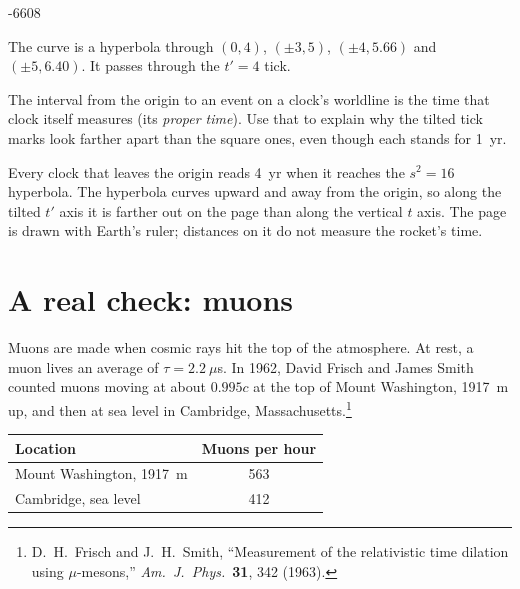 \documentclass{handout}
\newcommand{\room}[1]{0.35in plus #1fill}
\begin{document}
\begin{questions}
  \begin{center}
  \begin{spacetime}[0.8]{-6}{6}{0}{8}
  \end{spacetime}
  \end{center}

  \begin{solution}[\room{1}]
    The curve is a hyperbola through $(0,4)$, $(\pm3, 5)$, $(\pm4, 5.66)$ and
    $(\pm5, 6.40)$. It passes through the $t' = 4$ tick.
  \end{solution}

  \question The interval from the origin to an event on a clock's worldline is
  the time that clock itself measures (its \emph{proper time}). Use that to
  explain why the tilted tick marks look farther apart than the square ones,
  even though each stands for 1~yr.
  \begin{solution}[\room{2}]
    Every clock that leaves the origin reads 4~yr when it reaches the
    $s^2=16$ hyperbola. The hyperbola curves upward and away from the origin, so
    along the tilted $t'$ axis it is farther out on the page than along the
    vertical $t$ axis. The page is drawn with Earth's ruler; distances on it do
    not measure the rocket's time.
  \end{solution}
\end{questions}

\newpage
\section{A real check: muons}

Muons are made when cosmic rays hit the top of the atmosphere. At rest, a muon
lives an average of $\tau = 2.2~\mu$s. In 1962, David Frisch and James Smith
counted muons moving at about $0.995c$ at the top of Mount Washington, 1917~m
up, and then at sea level in Cambridge, Massachusetts.\footnote{D.~H.~Frisch and
J.~H.~Smith, ``Measurement of the relativistic time dilation using
$\mu$-mesons,'' \emph{Am.\ J.\ Phys.}\ \textbf{31}, 342 (1963).}

\begin{center}
\begin{tabular}{lc}
  \toprule
  Location & Muons per hour \\ \midrule
  Mount Washington, 1917~m & 563 \\
  Cambridge, sea level     & 412 \\ \bottomrule
\end{tabular}
\end{center}
\end{document}
